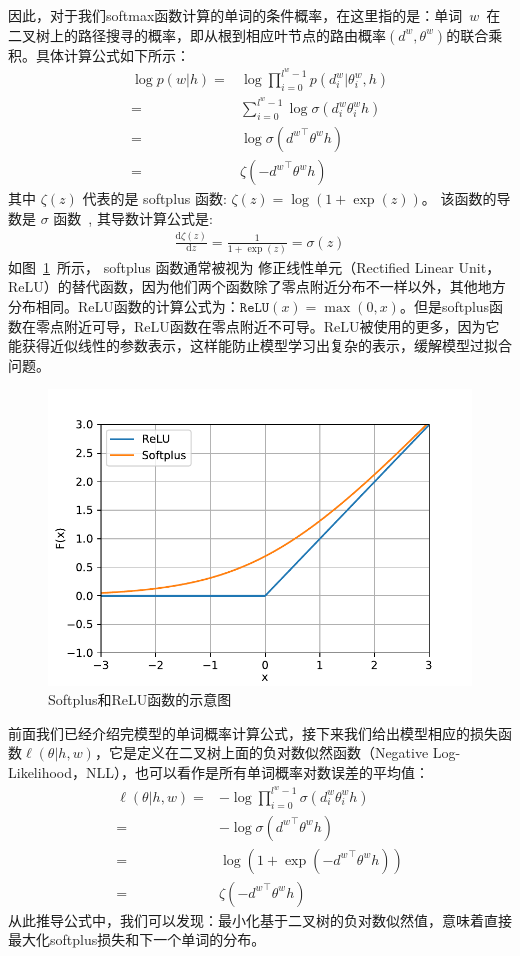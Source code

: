 因此，对于我们softmax函数计算的单词的条件概率，在这里指的是：单词~$w$~在二叉树上的路径搜寻的概率，即从根到相应叶节点的路由概率$(d^w,\theta^w)$的联合乘积。具体计算公式如下所示：
\begin{equation}\label{equ:pw}
\begin{split}
 \log p(w|h)=&\log\prod_{i=0}^{l^w-1} p(d^w_i|\theta_{i}^w,h) \\
 =& \sum_{i=0}^{l^w -1} \log\sigma(d_i^w \theta_{i}^w h)\\
 =&\log\sigma({d^w}^\top \theta^w h)\\
 =&\zeta(- {d^w}^\top \theta^w h )
 \end{split}
\end{equation}
其中 $\zeta(z)$ 代表的是 softplus 函数: $\zeta(z)= \log (1+\exp(z))$。 该函数的导数是 $\sigma$ 函数~, 其导数计算公式是:
\begin{equation}\label{equ:pw1}
\begin{split}
\frac{\mathrm{d}\zeta(z)}{\mathrm{d} z}=\frac{1}{1+\exp(z)} =\sigma(z)
\end{split}
\end{equation}
如图~\ref{fig:soft}~所示， softplus 函数通常被视为 修正线性单元（Rectified Linear Unit，ReLU）的替代函数，因为他们两个函数除了零点附近分布不一样以外，其他地方分布相同。ReLU函数的计算公式为：$\mathtt{ReLU}(x)=\max(0,x)$。但是softplus函数在零点附近可导，ReLU函数在零点附近不可导。ReLU被使用的更多，因为它能获得近似线性的参数表示，这样能防止模型学习出复杂的表示，缓解模型过拟合问题。
\begin{figure}[!ht]
  \centering
\includegraphics[width=.65\linewidth]{./figures/relus.pdf}
\caption{Softplus和ReLU函数的示意图}\label{fig:soft}
\end{figure}

前面我们已经介绍完模型的单词概率计算公式，接下来我们给出模型相应的损失函数$ \ell(\theta | h,w)$，它是定义在二叉树上面的负对数似然函数（Negative Log-Likelihood，NLL），也可以看作是所有单词概率对数误差的平均值：
\begin{equation}\label{equ:cost}
\begin{split}
   \ell(\theta|h,w) =&-\log\prod_{i=0}^{l^w -1} \sigma(d_i^w \theta_{i}^w h) \\
   =& -\log \sigma({d^w}^\top \theta^w h)\\
    =& \log (1+\exp(- {d^w}^\top \theta^w h )) \\
    =&  \zeta(- {d^w}^\top \theta^w h )
\end{split}
\end{equation}
从此推导公式中，我们可以发现：最小化基于二叉树的负对数似然值，意味着直接最大化softplus损失和下一个单词的分布。

